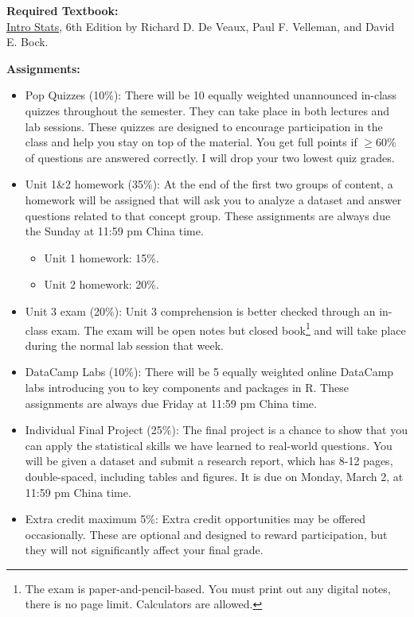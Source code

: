 \documentclass[11pt]{article}
\begin{document}
\vspace{0.5cm}
\large \textbf{Required Textbook:}\\[0.5em]
\href{https://www.pearson.com/en-us/subject-catalog/p/intro-stats/P200000006161/9780137374922?srsltid=AfmBOorburBAh8Z5hPZXmajuzatW53zDClHAQe8Ks9Fk1pQrkGpSkBuC}{Intro Stats}, 6th Edition by Richard D. De Veaux, Paul F. Velleman, and David E. Bock.





\vspace{0.5cm}
\large \textbf{Assignments:}
\begin{itemize}
    \item Pop Quizzes (10\%): There will be 10 equally weighted unannounced in-class quizzes throughout the semester. They can take place in both lectures and lab sessions. These quizzes are designed to encourage participation in the class and help you stay on top of the material. You get full points if $\geq$60\% of questions are answered correctly. I will drop your two lowest quiz grades.
    \item Unit 1\&2 homework (35\%): At the end of the first two groups of content, a homework will be assigned that
    will ask you to analyze a dataset and answer questions related to that concept group. These assignments are always due the Sunday at 11:59 pm China time. 
    \begin{itemize}
        \item Unit 1 homework: 15\%.
        \item Unit 2 homework: 20\%.
    \end{itemize}
    \item Unit 3 exam (20\%): Unit 3 comprehension is better checked through an in-class exam. The exam will be open notes but closed book\footnote{The exam is paper-and-pencil-based. You must print out any digital notes, there is no page limit. Calculators are allowed.} and will take place during the normal lab session that week.
    \item DataCamp Labs (10\%): There will be 5 equally weighted online DataCamp labs introducing you to key components and packages in R. These assignments are always due Friday at 11:59 pm China time. 
    \item Individual Final Project (25\%): The final project is a chance to show that you can apply the statistical skills we have learned to real-world questions. You will be given a dataset and submit a research report, which has 8-12 pages, double-spaced, including tables and figures. It is due on Monday, March 2, at 11:59 pm China time. 
    \item Extra credit maximum 5\%: Extra credit opportunities may be offered occasionally. These are optional and designed to reward participation, but they will not significantly affect your final grade.
\end{itemize}
\end{document}
